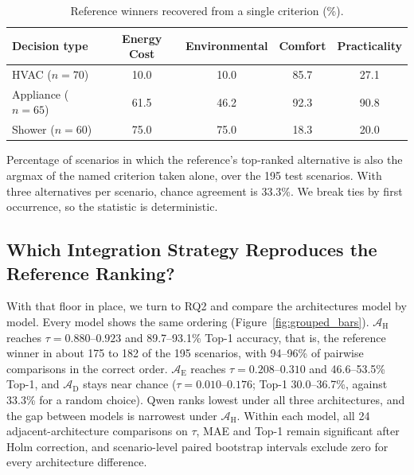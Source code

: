\documentclass[final,3p,times]{elsarticle}
\begin{document}
\begin{table}[htbp]
\caption{Reference winners recovered from a single criterion (\%).}
\label{tab:single-criterion-recovery}
\centering
\begin{threeparttable}
  \centering
  \footnotesize
  \begin{tabular}{lcccc}
    \toprule
    Decision type & Energy Cost & Environmental & Comfort & Practicality \\
    \midrule
    HVAC ($n=70$) & 10.0 & 10.0 & 85.7 & 27.1 \\
    Appliance ($n=65$) & 61.5 & 46.2 & 92.3 & 90.8 \\
    Shower ($n=60$) & 75.0 & 75.0 & 18.3 & 20.0 \\
    \bottomrule
  \end{tabular}
  \begin{tablenotes}
    \item Percentage of scenarios in which the reference's top-ranked alternative is also the argmax of the named criterion taken alone, over the 195 test scenarios. With three alternatives per scenario, chance agreement is 33.3\%. We break ties by first occurrence, so the statistic is deterministic.
  \end{tablenotes}
\end{threeparttable}
\end{table}

\FloatBarrier
\subsection{Which Integration Strategy Reproduces the Reference Ranking?}
\label{sec:res-ranking}
With that floor in place, we turn to RQ2 and compare the architectures model by model. Every model shows the same ordering (Figure~\ref{fig:grouped_bars}). $\mathcal{A}_{\text{H}}$ reaches $\tau=0.880$--$0.923$ and 89.7--93.1\% Top-1 accuracy, that is, the reference winner in about 175 to 182 of the 195 scenarios, with 94--96\% of pairwise comparisons in the correct order. $\mathcal{A}_{\text{E}}$ reaches $\tau=0.208$--$0.310$ and 46.6--53.5\% Top-1, and $\mathcal{A}_{\text{D}}$ stays near chance ($\tau=0.010$--$0.176$; Top-1 30.0--36.7\%, against 33.3\% for a random choice). Qwen ranks lowest under all three architectures, and the gap between models is narrowest under $\mathcal{A}_{\text{H}}$. Within each model, all 24 adjacent-architecture comparisons on $\tau$, MAE and Top-1 remain significant after Holm correction, and scenario-level paired bootstrap intervals exclude zero for every architecture difference.
\end{document}
